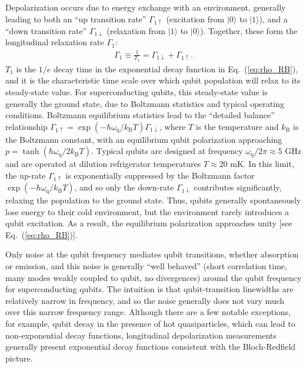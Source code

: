 \documentclass[aip,apr,twocolumn,showpacs,superscriptaddress,groupedaddress,nofootinbib,reprint]{revtex4-1}  %
\newcommand{\freq}{\omega_\text{q}}
\begin{document}
Depolarization occurs due to energy exchange with an environment, generally leading to both an ``up transition rate'' $\Gamma_{1\uparrow}$ (excitation from $|0 \rangle$ to $|1 \rangle$), and a ``down transition rate'' $\Gamma_{1\downarrow}$  (relaxation from $|1 \rangle$ to $|0 \rangle$). Together, these form the longitudinal relaxation rate $\Gamma_1$:
\begin{align}
    \Gamma_1 \equiv \frac{1}{T_1} = \Gamma_{1\downarrow} + \Gamma_{1\uparrow}.
\end{align}
%
$T_1$ is the $1/e$ decay time in the exponential decay function in Eq.~(\ref{eq:rho_RB}), and it is the characteristic time scale over which qubit population will relax to its steady-state value. For superconducting qubits, this steady-state value is generally the ground state, due to Boltzmann statistics and typical operating conditions. Boltzmann equilibrium statistics lead to the ``detailed balance'' relationship $\Gamma_{1\uparrow} = \exp(-\hbar \freq / k_{\mathrm{B}} T) \Gamma_{1\downarrow}$, where $T$ is the temperature and $k_{\mathrm{B}}$ is the Boltzmann constant, with an equilibrium qubit polarization approaching $p=\tanh (\hbar \freq / 2 k_{\mathrm{B}} T)$. Typical qubits are designed at frequency $\freq/2 \pi \approx 5$ GHz and are operated at dilution refrigerator temperatures $T \approx 20$ mK. In this limit, the up-rate $\Gamma_{1\uparrow}$ is exponentially suppressed by the Boltzmann factor $\exp(-\hbar \freq / k_{\mathrm{B}} T)$, and so only the down-rate $\Gamma_{1\downarrow}$ contributes significantly, relaxing the population to the ground state. Thus, qubits generally spontaneously lose energy to their cold environment, but the environment rarely introduces a qubit excitation. As a result, the equilibrium polarization approaches unity [see Eq.~(\ref{eq:rho_RB})]\cite{Siegman1986,Berns2006}.

Only noise at the qubit frequency mediates qubit transitions, whether absorption or emission, and this noise is generally ``well behaved'' (short correlation time, many modes weakly coupled to qubit, no divergences) around the qubit frequency for superconducting qubits. The intuition is that qubit-transition linewidths are relatively narrow in frequency, and so the noise generally does not vary much over this narrow frequency range. Although there are a few notable exceptions, for example, qubit decay in the presence of hot quasiparticles\cite{Catelani2011,Catelani2012,Gustavsson2016}, which can lead to non-exponential decay functions, longitudinal depolarization measurements generally present exponential decay functions consistent with the Bloch-Redfield picture.
\end{document}
